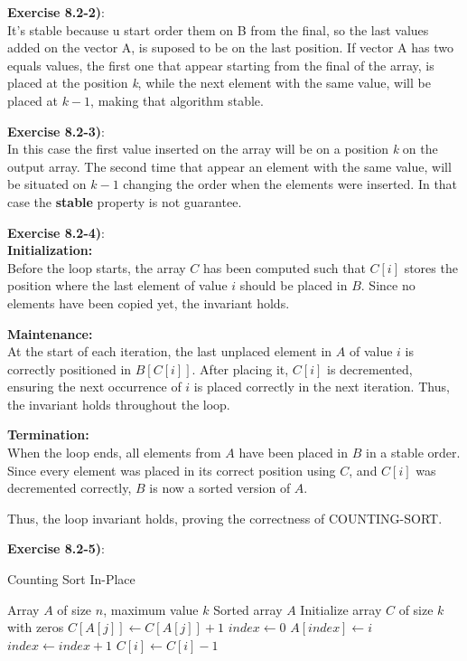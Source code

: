 \documentclass{article}
\newcounter{exercise}[section]   %
\begin{document}
\textbf{Exercise 8.2-2)}:\\
It's stable because u start order them on B from the final, so the last values added on the
vector A, is suposed to be on the last position. If vector A has two equals values, the first
one that appear starting from the final of the array, is placed at the position \textit{k},
while the next element with the same value, will be placed at \(k - 1\), making that algorithm
stable.

\textbf{Exercise 8.2-3)}:\\
In this case the first value inserted on the array will be on a position \textit{k} on the
output array. The second time that appear an element with the same value, will be situated
on \(k - 1\) changing the order when the elements were inserted. In that case the 
\textbf{stable} property is not guarantee.

\textbf{Exercise 8.2-4)}:\\
\textbf{Initialization:} \\
Before the loop starts, the array $C$ has been computed such that $C[i]$ stores 
the position where the last element of value $i$ should be placed in $B$. 
Since no elements have been copied yet, the invariant holds.

\textbf{Maintenance:} \\
At the start of each iteration, the last unplaced element in $A$ of value $i$ 
is correctly positioned in $B[C[i]]$. After placing it, $C[i]$ is decremented, 
ensuring the next occurrence of $i$ is placed correctly in the next iteration. 
Thus, the invariant holds throughout the loop.

\textbf{Termination:} \\
When the loop ends, all elements from $A$ have been placed in $B$ in a stable order. 
Since every element was placed in its correct position using $C$, and $C[i]$ was 
decremented correctly, $B$ is now a sorted version of $A$. 

Thus, the loop invariant holds, proving the correctness of COUNTING-SORT.

\textbf{Exercise 8.2-5)}:\\
\begin{algorithm}
    \caption{Counting Sort In-Place}
    \begin{algorithmic}[1]
    \Require Array $A$ of size $n$, maximum value $k$
    \Ensure Sorted array $A$
    \State Initialize array $C$ of size $k$ with zeros
        \State $C[A[j]] \gets C[A[j]] + 1$
    \EndFor
    \State $index \gets 0$
            \State $A[index] \gets i$
            \State $index \gets index + 1$
            \State $C[i] \gets C[i] - 1$
        \EndWhile
    \EndFor
    \end{algorithmic}
\end{algorithm}
\end{document}

